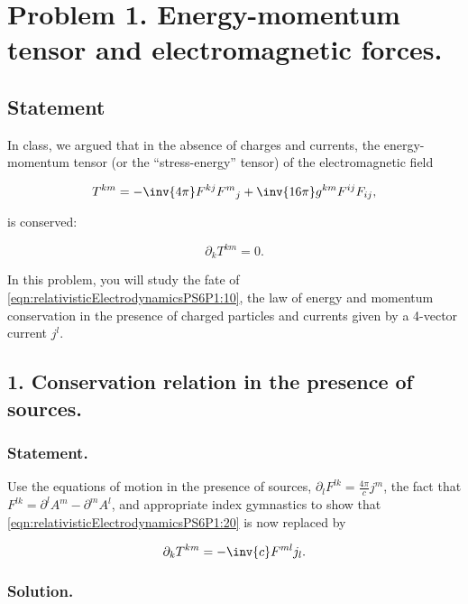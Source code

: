 \section{Problem 1.  Energy-momentum tensor and electromagnetic forces.}
\subsection{Statement}

In class, we argued that in the absence of charges and currents, the energy-momentum tensor (or the ``stress-energy'' tensor) of the electromagnetic field

\begin{equation}\label{eqn:relativisticElectrodynamicsPS6P1:10}
T^{k m} = -\inv{4\pi} F^{k j} {F^{m}}_j + \inv{16 \pi} g^{k m} F^{i j} F_{i j},
\end{equation}

is conserved:

\begin{equation}\label{eqn:relativisticElectrodynamicsPS6P1:20}
\partial_k T^{k m} = 0.
\end{equation}

In this problem, you will study the fate of \ref{eqn:relativisticElectrodynamicsPS6P1:10}, the law of energy and momentum conservation in the presence of charged particles and currents given by a 4-vector current $j^l$.

\subsection{1. Conservation relation in the presence of sources.}

\subsubsection{Statement.}

Use the equations of motion in the presence of sources, $\partial_l F^{l k} = \frac{4 \pi}{c} j^m$, the fact that $F^{l k} = \partial^l A^m - \partial^m A^l$, and appropriate index gymnastics to show that \ref{eqn:relativisticElectrodynamicsPS6P1:20} is now replaced by 

\begin{equation}\label{eqn:relativisticElectrodynamicsPS6P1:30}
\partial_k T^{k m} = -\inv{c} F^{m l} j_l.
\end{equation}

\subsubsection{Solution.}

